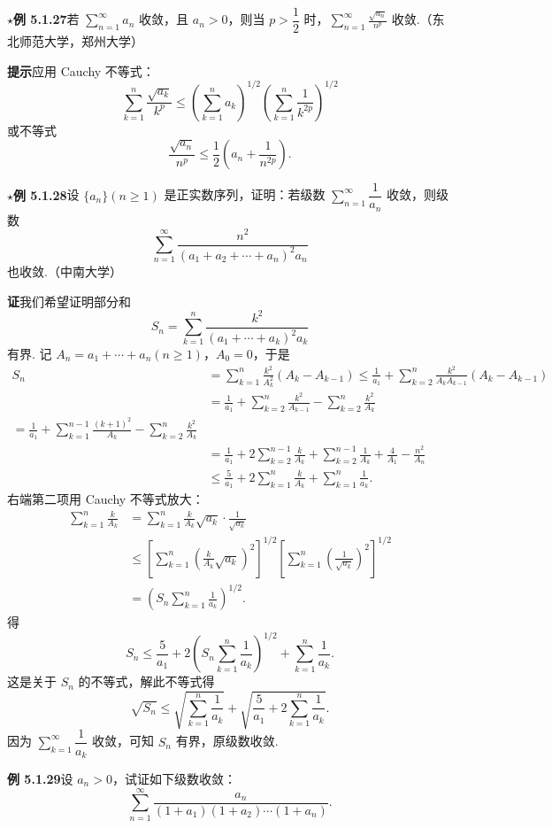 \documentclass[UTF8,12pt,a4paper,fontset=fandol]{ctexart}
\begin{document}
\noindent\textbf{$\star$例 5.1.27}\quad 若 $\displaystyle\sum_{n=1}^\infty a_n$ 收敛，且 $a_n>0$，则当 $p>\dfrac12$ 时，$\displaystyle\sum_{n=1}^\infty\frac{\sqrt{a_n}}{n^p}$ 收敛.（东北师范大学，郑州大学）

\noindent\textbf{提示}\quad 应用 Cauchy 不等式：
\[
  \sum_{k=1}^n\frac{\sqrt{a_k}}{k^p}
  \le\left(\sum_{k=1}^n a_k\right)^{1/2}
  \left(\sum_{k=1}^n\frac1{k^{2p}}\right)^{1/2}
\]
或不等式
\[
  \frac{\sqrt{a_n}}{n^p}\le\frac12\left(a_n+\frac1{n^{2p}}\right).
\]

\noindent\textbf{$\star$例 5.1.28}\quad 设 $\{a_n\}(n\ge1)$ 是正实数序列，证明：若级数 $\displaystyle\sum_{n=1}^\infty\dfrac1{a_n}$ 收敛，则级数
\[
  \sum_{n=1}^\infty
  \frac{n^2}{(a_1+a_2+\cdots+a_n)^2a_n}
\]
也收敛.（中南大学）

\noindent\textbf{证}\quad 我们希望证明部分和
\[
  S_n=\sum_{k=1}^n\frac{k^2}{(a_1+\cdots+a_k)^2a_k}
\]
有界. 记 $A_n=a_1+\cdots+a_n(n\ge1)$，$A_0=0$，于是
\[
\begin{aligned}
S_n
&=\sum_{k=1}^n\frac{k^2}{A_k^2}(A_k-A_{k-1})
\le\frac1{a_1}+\sum_{k=2}^n\frac{k^2}{A_kA_{k-1}}(A_k-A_{k-1})\\
&=\frac1{a_1}+\sum_{k=2}^n\frac{k^2}{A_{k-1}}-\sum_{k=2}^n\frac{k^2}{A_k}\\
 =\frac1{a_1}+\sum_{k=1}^{n-1}\frac{(k+1)^2}{A_k}-\sum_{k=2}^n\frac{k^2}{A_k}\\
&=\frac1{a_1}+2\sum_{k=2}^{n-1}\frac{k}{A_k}
  +\sum_{k=2}^{n-1}\frac1{A_k}
  +\frac4{A_1}-\frac{n^2}{A_n}\\
&\le\frac5{a_1}+2\sum_{k=1}^n\frac{k}{A_k}
  +\sum_{k=1}^n\frac1{a_k}.
\end{aligned}
\]
右端第二项用 Cauchy 不等式放大：
\[
\begin{aligned}
\sum_{k=1}^n\frac{k}{A_k}
&=\sum_{k=1}^n\frac{k}{A_k}\sqrt{a_k}\cdot\frac1{\sqrt{a_k}}\\
&\le
\left[\sum_{k=1}^n\left(\frac{k}{A_k}\sqrt{a_k}\right)^2\right]^{1/2}
\left[\sum_{k=1}^n\left(\frac1{\sqrt{a_k}}\right)^2\right]^{1/2}\\
&=\left(S_n\sum_{k=1}^n\frac1{a_k}\right)^{1/2}.
\end{aligned}
\]
得
\[
  S_n\le\frac5{a_1}+2\left(S_n\sum_{k=1}^n\frac1{a_k}\right)^{1/2}
  +\sum_{k=1}^n\frac1{a_k}.
\]
这是关于 $S_n$ 的不等式，解此不等式得
\[
  \sqrt{S_n}\le
  \sqrt{\sum_{k=1}^n\frac1{a_k}}+
  \sqrt{\frac5{a_1}+2\sum_{k=1}^n\frac1{a_k}}.
\]
因为 $\displaystyle\sum_{k=1}^\infty\dfrac1{a_k}$ 收敛，可知 $S_n$ 有界，原级数收敛.

\noindent\textbf{例 5.1.29}\quad 设 $a_n>0$，试证如下级数收敛：
\[
  \sum_{n=1}^\infty
  \frac{a_n}{(1+a_1)(1+a_2)\cdots(1+a_n)}.
\]
\end{document}
